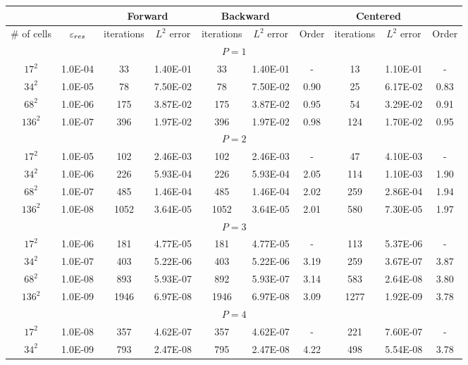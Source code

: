 {\small
\begin{longtable}{cccccccccc}
&  & \multicolumn{2}{c}{Forward} & \multicolumn{2}{c}{Backward}  &  & \multicolumn{2}{c}{Centered} &  \\ 
\toprule
\# of cells & $\varepsilon_{res}$ & iterations & $L^2$ error &iterations & $L^2$ error & Order & iterations & $L^2$ error & Order \\ 
 \multicolumn{10}{c}{ $P=1$ }  \\ 
$17^2$ & 1.0E-04 & 33 & 1.40E-01 & 33 & 1.40E-01 & - & 13 &1.10E-01 & - \\ 
$34^2$ & 1.0E-05 & 78 & 7.50E-02 & 78 & 7.50E-02 & 0.90 & 25&6.17E-02 & 0.83 \\ 
$68^2$ & 1.0E-06 & 175 & 3.87E-02 & 175 & 3.87E-02 & 0.95 & 54&3.29E-02 & 0.91 \\ 
$136^2$& 1.0E-07 & 396 & 1.97E-02 & 396 & 1.97E-02 & 0.98 & 124&1.70E-02 & 0.95 \\ 
 \multicolumn{10}{c}{ $P=2$ }  \\ 
$17^2$ & 1.0E-05 & 102 & 2.46E-03 & 102 & 2.46E-03 & - & 47&4.10E-03 & - \\ 
$34^2$ & 1.0E-06 & 226 & 5.93E-04 & 226 & 5.93E-04 & 2.05 & 114&1.10E-03 & 1.90 \\ 
$68^2$ & 1.0E-07 & 485 & 1.46E-04 & 485 & 1.46E-04 & 2.02 & 259&2.86E-04 & 1.94 \\ 
$136^2$& 1.0E-08 & 1052 & 3.64E-05 & 1052 & 3.64E-05 & 2.01 & 580&7.30E-05 & 1.97 \\ 
 \multicolumn{10}{c}{ $P=3$ }  \\ 
$17^2$ & 1.0E-06 & 181 & 4.77E-05 & 181 & 4.77E-05 & - & 113&5.37E-06 & - \\ 
$34^2$ & 1.0E-07 & 403 & 5.22E-06 & 403 & 5.22E-06 & 3.19 & 259&3.67E-07 & 3.87 \\ 
$68^2$ & 1.0E-08 & 893 & 5.93E-07 & 892 & 5.93E-07 & 3.14 & 583&2.64E-08 & 3.80 \\ 
$136^2$& 1.0E-09 & 1946 & 6.97E-08 & 1946 & 6.97E-08 & 3.09 & 1277&1.92E-09 & 3.78 \\ 
 \multicolumn{10}{c}{ $P=4$ }  \\ 
$17^2$ & 1.0E-08 & 357 & 4.62E-07 & 357 & 4.62E-07 & - & 221&7.60E-07 & - \\ 
$34^2$ & 1.0E-09 & 793 & 2.47E-08 & 795 & 2.47E-08 & 4.22 & 498&5.54E-08 & 3.78 \\ 

\end{longtable}}

